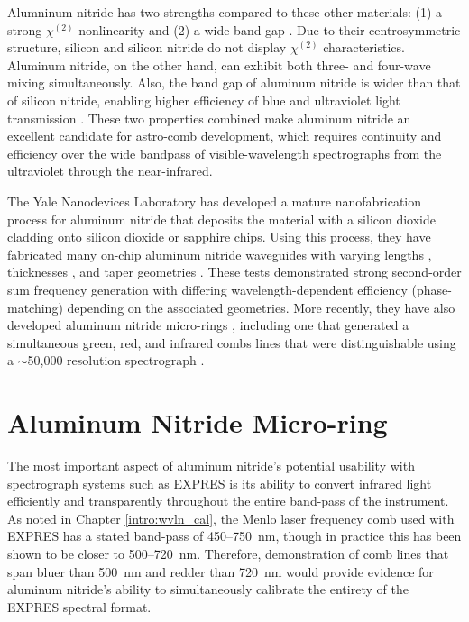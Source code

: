 Alumninum nitride has two strengths compared to these other materials: (1) a strong $\chi^{(2)}$ nonlinearity and (2) a wide band gap \citep{jung_aluminum_2016}. Due to their centrosymmetric structure, silicon and silicon nitride do not display $\chi^{(2)}$ characteristics. Aluminum nitride, on the other hand, can exhibit both three- and four-wave mixing simultaneously. Also, the band gap of aluminum nitride is wider than that of silicon nitride, enabling higher efficiency of blue and ultraviolet light transmission \citep{liu_beyond_2019}. These two properties combined make aluminum nitride an excellent candidate for astro-comb development, which requires continuity and efficiency over the wide bandpass of visible-wavelength spectrographs from the ultraviolet through the near-infrared.

The Yale Nanodevices Laboratory has developed a mature nanofabrication process for aluminum nitride that deposits the material with a silicon dioxide cladding onto silicon dioxide or sapphire chips. Using this process, they have fabricated many on-chip aluminum nitride waveguides with varying lengths \citep[300~\si{\micro\meter}--3~\si{\centi\meter};][]{xiong_aluminum_2012}, thicknesses \citep[330--1500~\si{\nano\meter};][]{pernice_second_2012}, and taper geometries \citep{liu_beyond_2019}. These tests demonstrated strong second-order sum frequency generation with differing wavelength-dependent efficiency (phase-matching) depending on the associated geometries. More recently, they have also developed aluminum nitride micro-rings \citep{jung_optical_2013, guo_second-harmonic_2016}, including one that generated a simultaneous green, red, and infrared combs lines that were distinguishable using a $\sim$50,000 resolution spectrograph \citep{jung_green_2014}.

\section{Aluminum Nitride Micro-ring} \label{astro-comb:micro-ring}

The most important aspect of aluminum nitride's potential usability with spectrograph systems such as EXPRES is its ability to convert infrared light efficiently and transparently throughout the entire band-pass of the instrument. As noted in Chapter \ref{intro:wvln_cal}, the Menlo laser frequency comb used with EXPRES has a stated band-pass of 450--750~\si{\nano\meter}, though in practice this has been shown to be closer to 500--720~\si{\nano\meter}. Therefore, demonstration of comb lines that span bluer than 500~\si{\nano\meter} and redder than 720~\si{\nano\meter} would provide evidence for aluminum nitride's ability to simultaneously calibrate the entirety of the EXPRES spectral format.

